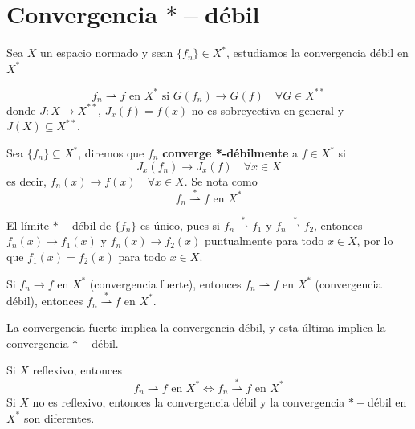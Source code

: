 \documentclass[12pt]{book}
\begin{document}
\section{Convergencia $*-$débil}
\noindent
Sea $X$ un espacio normado y sean $\{f_n\} \in X^*$, estudiamos la convergencia débil en $X^*$

\begin{equation*}
    f_n \rightharpoonup  f \text{ en } X^* \text{ si } G(f_n) \longrightarrow G(f) \quad \forall G \in X^{**}
\end{equation*}
donde $J: X \longrightarrow X^{**}$, $J_x(f) = f(x)$ no es sobreyectiva en general y $J(X) \subseteq X^{**}$.

\begin{definicion}
    Sea $\{f_n\} \subseteq X^*$, diremos que $f_n$ \textbf{converge *-débilmente} a $f \in X^*$ si
    \begin{equation*}
        J_x(f_n) \longrightarrow J_x(f) \quad \forall x \in X
    \end{equation*}
    es decir, $f_n(x) \longrightarrow f(x) \quad \forall x \in X$. Se nota como 
    \begin{equation*}
        f_n \overset{*}{\rightharpoonup} f \text{ en } X^*
    \end{equation*}
\end{definicion}

\begin{observacion}
    El límite $*-$débil de $\{f_n\}$ es único, pues si $f_n \overset{*}{\rightharpoonup} f_1$ y $f_n \overset{*}{\rightharpoonup} f_2$, entonces \mbox{$f_n(x) \longrightarrow f_1(x)$} y \mbox{$f_n(x) \longrightarrow f_2(x)$} puntualmente para todo $x \in X$, por lo que $f_1(x) = f_2(x)$ para todo $x \in X$.
\end{observacion}


\begin{observacion}
    Si $f_n \longrightarrow f$ en $X^*$ (convergencia fuerte), entonces $f_n \rightharpoonup f$ en $X^*$ (convergencia débil), entonces $f_n \overset{*}{\rightharpoonup} f$ en $X^*$. \\
\end{observacion}


\begin{prop}
    La convergencia fuerte implica la convergencia débil, y esta última implica la convergencia $*-$débil.
\end{prop}

\begin{observacion}
    Si $X$ reflexivo, entonces
    \begin{equation*}
        f_n \rightharpoonup f \text{ en } X^* \iff f_n \overset{*}{\rightharpoonup} f \text{ en } X^*
    \end{equation*}
    Si $X$ no es reflexivo, entonces la convergencia débil y la convergencia $*-$débil en $X^*$ son diferentes. \\
\end{observacion}
\end{document}
